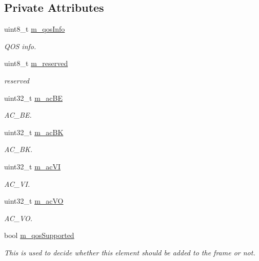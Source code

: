 \subsection*{Private Attributes}
\begin{DoxyCompactItemize}
\item 
uint8\+\_\+t \hyperlink{classns3_1_1EdcaParameterSet_ac7bf02b9943d07176358715f38a894ae}{m\+\_\+qos\+Info}
\begin{DoxyCompactList}\small\item\em Q\+OS info. \end{DoxyCompactList}\item 
uint8\+\_\+t \hyperlink{classns3_1_1EdcaParameterSet_a287fbf667f2e4ee7d44af88383dab6c2}{m\+\_\+reserved}
\begin{DoxyCompactList}\small\item\em reserved \end{DoxyCompactList}\item 
uint32\+\_\+t \hyperlink{classns3_1_1EdcaParameterSet_a43ef5005534c79ea230fc9104640e59c}{m\+\_\+ac\+BE}
\begin{DoxyCompactList}\small\item\em A\+C\+\_\+\+BE. \end{DoxyCompactList}\item 
uint32\+\_\+t \hyperlink{classns3_1_1EdcaParameterSet_ae50d10f4ebb43a541435d3fda88faa10}{m\+\_\+ac\+BK}
\begin{DoxyCompactList}\small\item\em A\+C\+\_\+\+BK. \end{DoxyCompactList}\item 
uint32\+\_\+t \hyperlink{classns3_1_1EdcaParameterSet_a405a4382184174dbd1f920e6fe87595a}{m\+\_\+ac\+VI}
\begin{DoxyCompactList}\small\item\em A\+C\+\_\+\+VI. \end{DoxyCompactList}\item 
uint32\+\_\+t \hyperlink{classns3_1_1EdcaParameterSet_a870fca52aca9ea9526171bb87378355d}{m\+\_\+ac\+VO}
\begin{DoxyCompactList}\small\item\em A\+C\+\_\+\+VO. \end{DoxyCompactList}\item 
bool \hyperlink{classns3_1_1EdcaParameterSet_a96ff9c3d2e5083cedfcfd5e8f567118d}{m\+\_\+qos\+Supported}
\begin{DoxyCompactList}\small\item\em This is used to decide whether this element should be added to the frame or not. \end{DoxyCompactList}\end{DoxyCompactItemize}
